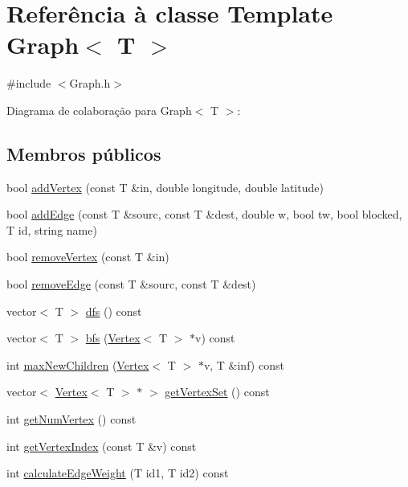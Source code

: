 \hypertarget{class_graph}{}\section{Referência à classe Template Graph$<$ T $>$}
\label{class_graph}


{\ttfamily \#include $<$Graph.\+h$>$}



Diagrama de colaboração para Graph$<$ T $>$\+:
\subsection*{Membros públicos}
\begin{DoxyCompactItemize}
\item 
bool \hyperlink{class_graph_a6283650774199e3dc971f226eb35cf50}{add\+Vertex} (const T \&in, double longitude, double latitude)
\item 
bool \hyperlink{class_graph_add7835e0874b6bb515980db864e39a86}{add\+Edge} (const T \&sourc, const T \&dest, double w, bool tw, bool blocked, T id, string name)
\item 
bool \hyperlink{class_graph_af9c903104ad69a7782979fa9caedf163}{remove\+Vertex} (const T \&in)
\item 
bool \hyperlink{class_graph_a1106092a37366486cf55576f9ec01692}{remove\+Edge} (const T \&sourc, const T \&dest)
\item 
vector$<$ T $>$ \hyperlink{class_graph_a3f62ba0e37c5c011299c93d60e3a8be3}{dfs} () const 
\item 
vector$<$ T $>$ \hyperlink{class_graph_a0e9598b98be2570eb432690411a577e8}{bfs} (\hyperlink{class_vertex}{Vertex}$<$ T $>$ $\ast$v) const 
\item 
int \hyperlink{class_graph_ab8fd74c3cf8dca6eaa82d39fd1216f52}{max\+New\+Children} (\hyperlink{class_vertex}{Vertex}$<$ T $>$ $\ast$v, T \&inf) const 
\item 
vector$<$ \hyperlink{class_vertex}{Vertex}$<$ T $>$ $\ast$ $>$ \hyperlink{class_graph_ab7dc5ec1c34df811d560021b726e95ec}{get\+Vertex\+Set} () const 
\item 
int \hyperlink{class_graph_a295932f117d92c825a97ec458e0fb332}{get\+Num\+Vertex} () const 
\item 
int \hyperlink{class_graph_a98ad6f08d48ceb7527cb37433c0efc56}{get\+Vertex\+Index} (const T \&v) const 
\item 
int \hyperlink{class_graph_a41708134b9e518beea032e6e62d84bef}{calculate\+Edge\+Weight} (T id1, T id2) const 

\end{DoxyCompactItemize}
